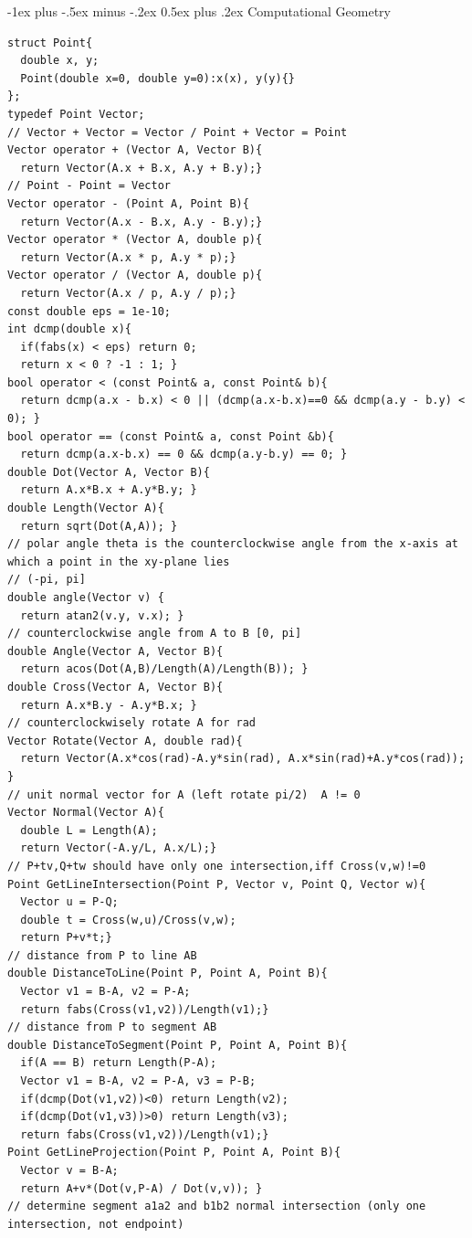 \documentclass[10pt,landscape]{article}
\makeatletter
\renewcommand{\section}{\@startsection{section}{1}{0mm}%
                                {-1ex plus -.5ex minus -.2ex}%
                                {0.5ex plus .2ex}%
                                {\normalfont\large\bfseries}}
\makeatother
\begin{document}
\begin{multicols}{2}
\section{Computational Geometry}
\begin{lstlisting}
struct Point{
  double x, y;
  Point(double x=0, double y=0):x(x), y(y){}
};
typedef Point Vector;
// Vector + Vector = Vector / Point + Vector = Point
Vector operator + (Vector A, Vector B){
  return Vector(A.x + B.x, A.y + B.y);}
// Point - Point = Vector
Vector operator - (Point A, Point B){
  return Vector(A.x - B.x, A.y - B.y);}
Vector operator * (Vector A, double p){
  return Vector(A.x * p, A.y * p);}
Vector operator / (Vector A, double p){
  return Vector(A.x / p, A.y / p);}
const double eps = 1e-10;
int dcmp(double x){
  if(fabs(x) < eps) return 0;
  return x < 0 ? -1 : 1; }
bool operator < (const Point& a, const Point& b){
  return dcmp(a.x - b.x) < 0 || (dcmp(a.x-b.x)==0 && dcmp(a.y - b.y) < 0); }
bool operator == (const Point& a, const Point &b){
  return dcmp(a.x-b.x) == 0 && dcmp(a.y-b.y) == 0; }
double Dot(Vector A, Vector B){
  return A.x*B.x + A.y*B.y; }
double Length(Vector A){
  return sqrt(Dot(A,A)); }
// polar angle theta is the counterclockwise angle from the x-axis at which a point in the xy-plane lies
// (-pi, pi]
double angle(Vector v) {
  return atan2(v.y, v.x); }
// counterclockwise angle from A to B [0, pi]
double Angle(Vector A, Vector B){
  return acos(Dot(A,B)/Length(A)/Length(B)); }
double Cross(Vector A, Vector B){
  return A.x*B.y - A.y*B.x; }
// counterclockwisely rotate A for rad
Vector Rotate(Vector A, double rad){
  return Vector(A.x*cos(rad)-A.y*sin(rad), A.x*sin(rad)+A.y*cos(rad)); }
// unit normal vector for A (left rotate pi/2)  A != 0
Vector Normal(Vector A){
  double L = Length(A);
  return Vector(-A.y/L, A.x/L);}
// P+tv,Q+tw should have only one intersection,iff Cross(v,w)!=0
Point GetLineIntersection(Point P, Vector v, Point Q, Vector w){
  Vector u = P-Q;
  double t = Cross(w,u)/Cross(v,w);
  return P+v*t;}
// distance from P to line AB
double DistanceToLine(Point P, Point A, Point B){
  Vector v1 = B-A, v2 = P-A;
  return fabs(Cross(v1,v2))/Length(v1);}
// distance from P to segment AB
double DistanceToSegment(Point P, Point A, Point B){
  if(A == B) return Length(P-A);
  Vector v1 = B-A, v2 = P-A, v3 = P-B;
  if(dcmp(Dot(v1,v2))<0) return Length(v2);
  if(dcmp(Dot(v1,v3))>0) return Length(v3);
  return fabs(Cross(v1,v2))/Length(v1);}
Point GetLineProjection(Point P, Point A, Point B){
  Vector v = B-A;
  return A+v*(Dot(v,P-A) / Dot(v,v)); }
// determine segment a1a2 and b1b2 normal intersection (only one intersection, not endpoint)

\end{lstlisting}
\end{multicols}
\end{document}
